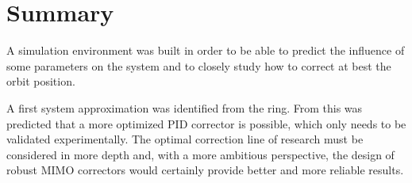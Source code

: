 \section{Summary}
A simulation environment was built in order to be able to predict the influence of some parameters on the system and to closely study how to correct at best the orbit position.

A first system approximation was identified from the ring. From this was predicted that a more optimized PID corrector is possible, which only needs to be validated experimentally. The optimal correction line of research must be considered in more depth and, with a more ambitious perspective, the design of robust MIMO correctors would certainly provide better and more reliable results.